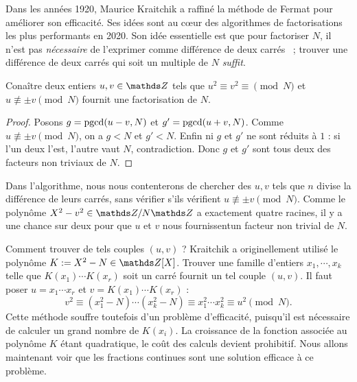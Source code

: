 Dans les années 1920, Maurice Kraitchik a raffiné la méthode de Fermat pour
améliorer son efficacité. Ses idées sont au cœur des algorithmes de
factorisations les plus performants en 2020. Son idée essentielle est que pour
factoriser $N$, il n'est pas \emph{nécessaire} de l'exprimer comme différence
de deux carrés ~; trouver une différence de deux carrés qui soit un multiple de
$N$ \emph{suffit}.

\begin{lemme}
	Conaître deux entiers $u, v \in \Z$ tels que $u^2 \equiv v^2 \equiv
	\pmod{N}$ et $u\not\equiv \pm v\pmod{N}$ fournit une factorisation de $N$.
\end{lemme}

\begin{proof}
	Posons $g =\operatorname{pgcd}(u-v, N)$ et $g' = \operatorname{pgcd}(u+v, N)$. Comme $u\not\equiv \pm
	v\pmod{N}$, on a $g<N$ et $g'<N$. Enfin ni $g$ et $g'$ ne sont réduits à
	$1$ : si l'un deux l'est, l'autre vaut $N$, contradiction. Donc $g$ et $g'$
	sont tous deux des facteurs non triviaux de $N$.
\end{proof}

\begin{remarque}
	Dans l'algorithme, nous nous contenterons de chercher des $u, v$ tels que
	$n$ divise la différence de leurs carrés, sans vérifier s'ils vérifient $u
	\not\equiv \pm v\pmod{N}$. Comme le polynôme $X^2 - v^2 \in \Z/N\Z$ a
	exactement quatre racines, il y a \og{} une chance sur deux \fg pour que
	$u$ et $v$ nous fournissentun facteur non trivial de $N$. \\
\end{remarque}

Comment trouver de tels couples $(u, v)$ ? Kraitchik a originellement utilisé
le polynôme $K := X^2 - N \in \Z[X]$. Trouver une famille d'entiers $x_1,
\cdots, x_k$ telle que $K(x_1)\cdots K(x_r)$ soit un carré fournit un tel
couple $(u, v)$. Il faut poser $u = x_1\cdots x_r$ et $v = K(x_1)\cdots K(x_r)$
: \[v^2 \equiv (x_1^2 - N)\cdots (x_k^2 - N) \equiv x_1^2 \cdots x_k^2 \equiv
u^2\pmod{N}.\] Cette méthode souffre toutefois d'un problème d'efficacité,
puisqu'il est nécessaire de calculer un grand nombre de $K(x_i)$. La croissance
de la fonction associée au polynôme $K$ étant quadratique, le coût des calculs
devient prohibitif. Nous allons maintenant voir que les fractions continues
sont une solution efficace à ce problème.

